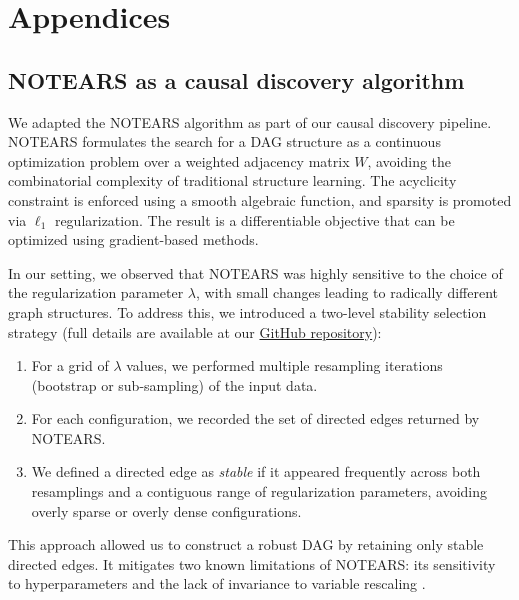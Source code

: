 \documentclass[
]{article}
\providecommand{\tightlist}{%
  \setlength{\itemsep}{0pt}\setlength{\parskip}{0pt}}\usepackage{longtable,booktabs,array}
\theoremstyle{definition}
\theoremstyle{remark}
\begin{document}
\newpage{}

\section{Appendices}\label{appendices}

\subsection{NOTEARS as a causal discovery algorithm}\label{sec-notears}

We adapted the NOTEARS algorithm  as
part of our causal discovery pipeline. NOTEARS formulates the search for
a DAG structure as a continuous optimization problem over a weighted
adjacency matrix \(W\), avoiding the combinatorial complexity of
traditional structure learning. The acyclicity constraint is enforced
using a smooth algebraic function, and sparsity is promoted via
\(\ell_1\) regularization. The result is a differentiable objective that
can be optimized using gradient-based methods.

In our setting, we observed that NOTEARS was highly sensitive to the
choice of the regularization parameter \(\lambda\), with small changes
leading to radically different graph structures. To address this, we
introduced a two-level stability selection strategy (full details are
available at our \href{https://github.com/cambroise/chloroDAG}{GitHub
repository}):

\begin{enumerate}
\def\labelenumi{\arabic{enumi}.}
\tightlist
\item
  For a grid of \(\lambda\) values, we performed multiple resampling
  iterations (bootstrap or sub-sampling) of the input data.
\item
  For each configuration, we recorded the set of directed edges returned
  by NOTEARS.
\item
  We defined a directed edge as \emph{stable} if it appeared frequently
  across both resamplings and a contiguous range of regularization
  parameters, avoiding overly sparse or overly dense configurations.
\end{enumerate}

This approach allowed us to construct a robust DAG by retaining only
stable directed edges. It mitigates two known limitations of NOTEARS:
its sensitivity to hyperparameters and the lack of invariance to
variable rescaling .
\end{document}

